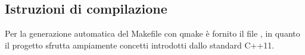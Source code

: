 \subsection{Istruzioni di compilazione} %
\label{sub:istruzioni_di_compilazione}
Per la generazione automatica del Makefile con qmake è fornito il file , in quanto il progetto sfrutta ampiamente concetti introdotti dallo standard C++11.
